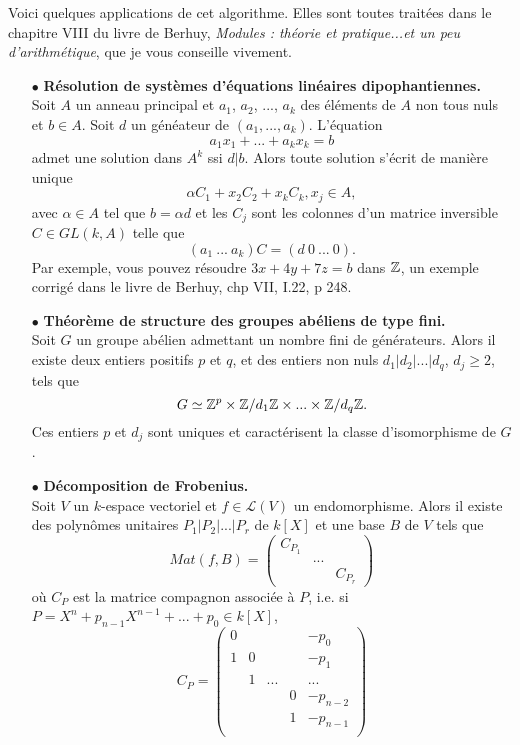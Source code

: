 Voici quelques applications de cet algorithme. Elles sont toutes traitées dans le chapitre VIII du livre de Berhuy, \textit{Modules : théorie et pratique...et un peu d'arithmétique}, que je vous conseille vivement.\\
\begin{itemize}
\item[$\bullet$]\textbf{ Résolution de systèmes d'équations linéaires dipophantiennes.}\\ Soit $A$ un anneau principal et $a_1$, $a_2$, ..., $a_k$ des éléments de $A$ non tous nuls et $b\in A$. Soit $d$ un généateur de $(a_1,...,a_k)$. L'équation 
\[a_1 x_1 +...+a_k x_k = b\]
admet une solution dans $A^k$ ssi $d|b$. Alors toute solution s'écrit de manière unique
\[\alpha C_1 +x_2 C_2+ x_k C_k, x_j\in A,\]
avec $\alpha \in A$ tel que $b=\alpha d$ et les $C_j$ sont les colonnes d'un matrice inversible $C\in GL(k,A)$ telle que 
\[(a_1 \ ...\ a_k) C = (d\ 0\ ...\ 0).\]
Par exemple, vous pouvez résoudre $3x + 4y+7z =b$ dans $\mathbb Z$, un exemple corrigé dans le livre de Berhuy, chp VII, I.22, p 248.
\item[$\bullet$] \textbf{Théorème de structure des groupes abéliens de type fini.}\\ Soit $G$ un groupe abélien admettant un nombre fini de générateurs. Alors il existe deux entiers positifs $p$ et $q$, et des entiers non nuls $d_1|d_2|...|d_q$, $d_j\geq 2$, tels que 
\[G\simeq \mathbb Z^p\times \mathbb Z/d_1\mathbb Z \times ...\times \mathbb Z/d_q\mathbb Z.\]
Ces entiers $p$ et $d_j$ sont uniques et caractérisent la classe d'isomorphisme de $G$.
\item[$\bullet$] \textbf{Décomposition de Frobenius.} \\ Soit $V$ un $k$-espace vectoriel et $f\in \mathcal L(V)$ un endomorphisme. Alors il existe des polynômes unitaires $P_1|P_2|...|P_r$ de $k[X]$ et une base $B$ de $V$ tels que
\[Mat(f,B)=\begin{pmatrix}C_{P_1} & & \\
& ... & \\ & & C_{P_r} \end{pmatrix}\]
où $C_P$ est la matrice compagnon associée à $P$, i.e. si $P=X^n+p_{n-1}X^{n-1}+...+p_0\in k[X]$,
\[C_P=\begin{pmatrix}
0 &    &  & & -p_0\\
1 & 0 &   &  &-p_1\\
 &    1 & ...  &  &...\\
&      &      & 0  &  -p_{n-2} \\
&       &    &  1 &  -p_{n-1}  \\ 

\end{pmatrix}\]
\end{itemize}
